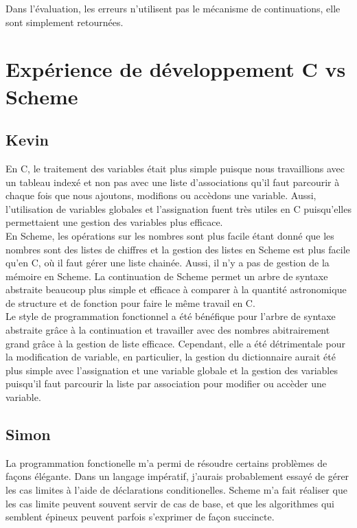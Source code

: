 \documentclass[a4paper,12pt,french]{article}
\begin{document}
        Dans l'évaluation, les erreurs n'utilisent pas le mécanisme de continuations, elle sont simplement retournées.
	\newpage
	\section{Expérience de développement C vs Scheme}
	\subsection{Kevin}
	En C, le traitement des variables était plus simple puisque nous travaillions avec un tableau indexé et non pas avec une liste d'associations qu'il faut parcourir à chaque fois que nous ajoutons, modifions ou accèdons une variable. Aussi, l'utilisation de variables globales et l'assignation fuent très utiles en C puisqu'elles permettaient une gestion des variables plus efficace.\\
	
	En Scheme, les opérations sur les nombres sont plus facile étant donné que les nombres sont des listes de chiffres et la gestion des listes en Scheme est plus facile qu'en C, où il faut gérer une liste chainée. Aussi, il n'y a pas de gestion de la mémoire en Scheme. La continuation de Scheme permet un arbre de syntaxe abstraite beaucoup plus simple et efficace à comparer à la quantité astronomique de structure et de fonction pour faire le même travail en C.\\
	
	Le style de programmation fonctionnel a été bénéfique pour l'arbre de syntaxe abstraite grâce à la continuation et travailler avec des nombres abitrairement grand grâce à la gestion de liste efficace. Cependant, elle a été détrimentale pour la modification de variable, en particulier, la gestion du dictionnaire aurait été plus simple avec l'assignation et une variable globale et la gestion des variables puisqu'il faut parcourir la liste par association pour modifier ou accèder une variable.\\
        \subsection{Simon}
        La programmation fonctionelle m'a permi de résoudre certains problèmes de façons élégante. Dans un langage impératif, j'aurais probablement essayé de gérer les cas limites à l'aide de déclarations conditionelles. Scheme m'a fait réaliser que les cas limite peuvent souvent servir de cas de base, et que les algorithmes qui semblent épineux peuvent parfois s'exprimer de façon succincte.\\
\end{document}
